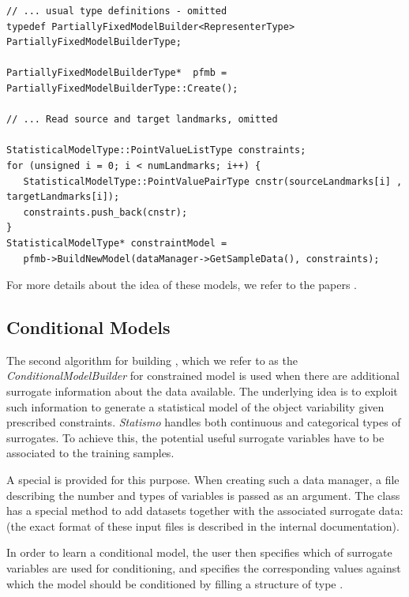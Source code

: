 \documentclass{InsightArticle}
\newcommand{\Statismo}{\emph{Statismo}\xspace}
\begin{document}
\begin{verbatim}
// ... usual type definitions - omitted
typedef PartiallyFixedModelBuilder<RepresenterType> PartiallyFixedModelBuilderType;

PartiallyFixedModelBuilderType*  pfmb = PartiallyFixedModelBuilderType::Create();

// ... Read source and target landmarks, omitted

StatisticalModelType::PointValueListType constraints;
for (unsigned i = 0; i < numLandmarks; i++) { 
   StatisticalModelType::PointValuePairType cnstr(sourceLandmarks[i] , targetLandmarks[i]);
   constraints.push_back(cnstr);
}
StatisticalModelType* constraintModel = 
   pfmb->BuildNewModel(dataManager->GetSampleData(), constraints);
\end{verbatim}

For more details about the idea of these models, we refer to the papers \cite{Mathsurface, PriorDeformation}.

\subsection{Conditional Models}
The second algorithm for building , which we refer to as the
\emph{ConditionalModelBuilder} for constrained model is used when
there are additional surrogate information about the data available.
The underlying idea is to exploit such information to generate a
statistical model of the object variability given prescribed
constraints. \Statismo handles both continuous and categorical types
of surrogates.  To achieve this, the potential useful surrogate
variables have to be associated to the training samples.

A special  is provided for this
purpose. When creating such a data manager, a file describing the
number and types of variables is passed as an argument.  The class has
a special method to add datasets together with the associated
surrogate data: 
(the exact format of these input files is described in the internal documentation).

In order to learn a conditional model, the user then specifies which
of surrogate variables are used for conditioning, and specifies the
corresponding values against which the model should be conditioned by
filling a structure of type .
\end{document}
